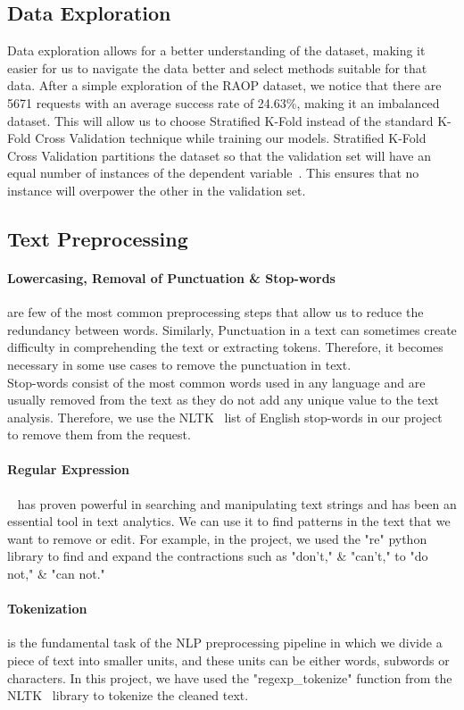 \documentclass[conference]{IEEEtran}
\begin{document}
\subsection{Data Exploration}
Data exploration allows for a better understanding of the dataset, making it easier for us to navigate the data better and select methods suitable for that data. After a simple exploration of the RAOP dataset, we notice that there are 5671 requests with an average success rate of 24.63\%, making it an imbalanced dataset. This will allow us to choose Stratified K-Fold instead of the standard K-Fold Cross Validation technique while training our models. Stratified K-Fold Cross Validation partitions the dataset so that the validation set will have an equal number of instances of the dependent variable~\cite{strat_kfold}. This ensures that no instance will overpower the other in the validation set.

\subsection{Text Preprocessing}
\paragraph{Lowercasing, Removal of Punctuation \& Stop-words}
are few of the most common preprocessing steps that allow us to reduce the redundancy between words. Similarly, Punctuation in a text can sometimes create difficulty in comprehending the text or extracting tokens. Therefore, it becomes necessary in some use cases to remove the punctuation in text.\\
Stop-words consist of the most common words used in any language and are usually removed from the text as they do not add any unique value to the text analysis. Therefore, we use the NLTK~\cite{nltk} list of English stop-words in our project to remove them from the request.
\paragraph{Regular Expression}~\cite{regex} has proven powerful in searching and manipulating text strings and has been an essential tool in text analytics. We can use it to find patterns in the text that we want to remove or edit. For example, in the project, we used the "re" python library to find and expand the contractions such as "don't," \& "can't," to "do not," \& "can not."
\paragraph{Tokenization} is the fundamental task of the NLP preprocessing pipeline in which we divide a piece of text into smaller units, and these units can be either words, subwords or characters. In this project, we have used the "regexp\_tokenize" function from the NLTK~\cite{nltk} library to tokenize the cleaned text.
\end{document}

